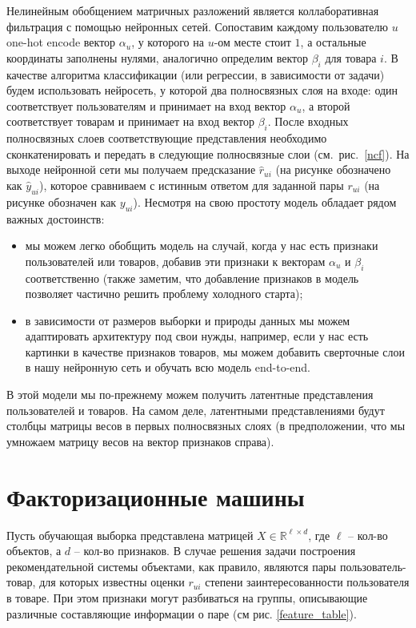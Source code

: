 \documentclass[12pt,a4paper]{article}
\begin{document}
Нелинейным обобщением матричных разложений является коллаборативная фильтрация с помощью нейронных сетей. Сопоставим каждому пользователю $u$ one-hot encode вектор $\alpha_u$, у которого на $u$-ом месте стоит $1$, а остальные координаты заполнены нулями, аналогично определим вектор $\beta_i$ для товара $i$. В качестве алгоритма классификации (или регрессии, в зависимости от задачи) будем использовать нейросеть, у которой два полносвязных слоя на входе: один соответствует пользователям и принимает на вход вектор $\alpha_u$, а второй соответствует товарам и принимает на вход вектор $\beta_i$. После входных полносвязных слоев соответствующие представления необходимо сконкатенировать и передать в следующие полносвязные слои (см.~рис.~\ref{ncf}). На выходе нейронной сети мы получаем предсказание $\widehat{r}_{ui}$ (на рисунке обозначено как $\widehat{y}_{ui}$), которое сравниваем с истинным ответом для заданной пары $r_{ui}$ (на рисунке обозначен как $y_{ui}$).
\newpage
Несмотря на свою простоту модель обладает рядом важных достоинств:
\begin{itemize}
	\item мы можем легко обобщить модель на случай, когда у нас есть признаки пользователей или товаров, добавив эти признаки к векторам $\alpha_u$ и $\beta_i$ соответственно (также заметим, что добавление признаков в модель позволяет частично решить проблему холодного старта);
	\item в зависимости от размеров выборки и природы данных мы можем адаптировать архитектуру под свои нужды, например, если у нас есть картинки в качестве признаков товаров, мы можем добавить сверточные слои в нашу нейронную сеть и обучать всю модель end-to-end.
\end{itemize}

В этой модели мы по-прежнему можем получить латентные представления пользователей и товаров. На самом деле, латентными представлениями будут столбцы матрицы весов в первых полносвязных слоях (в предположении, что мы умножаем матрицу весов на вектор признаков справа).

\section{Факторизационные машины}

Пусть обучающая выборка представлена матрицей $X \in \mathbb{R}^{\ell \times d}$, где $\ell$ – кол-во объектов, а $d$ – кол-во признаков. В случае решения задачи построения рекомендательной системы объектами, как правило, являются пары пользователь-товар, для которых известны оценки $r_{ui}$ степени заинтересованности пользователя в товаре. При этом признаки могут разбиваться на группы, описывающие различные составляющие информации о паре (см рис. \ref{feature_table}).
\end{document}
